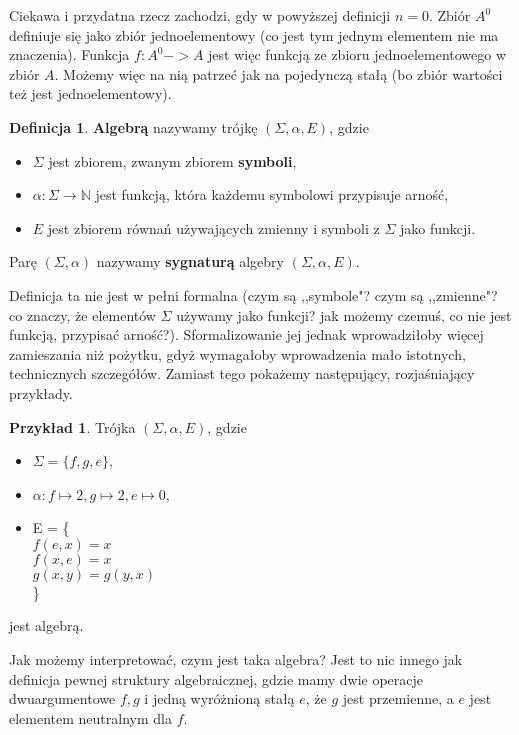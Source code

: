 \documentclass{article}
\theoremstyle{definition}
\newtheorem{definition}{Definicja}[section]
\newtheorem{example}{Przykład}[section]
\begin{document}
Ciekawa i przydatna rzecz zachodzi, gdy w powyższej definicji $n = 0$.
Zbiór $A^0$ definiuje się jako zbiór jednoelementowy (co jest tym jednym elementem nie ma znaczenia).
Funkcja $f:A^0 -> A$ jest więc funkcją ze zbioru jednoelementowego w zbiór $A$.
Możemy więc na nią patrzeć jak na pojedynczą stałą (bo zbiór wartości też jest jednoelementowy).

\begin{definition}
	\textbf{Algebrą} nazywamy trójkę $(\Sigma, \alpha, E)$,
	gdzie
	\begin{itemize}
		\item $\Sigma$ jest zbiorem, zwanym zbiorem \textbf{symboli},
		\item $\alpha: \Sigma \to \mathbb{N}$ jest funkcją, która każdemu symbolowi przypisuje arność,
		\item $E$ jest zbiorem równań używających zmienny i symboli z $\Sigma$ jako funkcji.
	\end{itemize}
	Parę $(\Sigma, \alpha)$ nazywamy \textbf{sygnaturą} algebry $(\Sigma, \alpha, E)$.
\end{definition}

Definicja ta nie jest w pełni formalna (czym są ,,symbole"? czym są ,,zmienne"? co znaczy, że elementów $\Sigma$ używamy jako funkcji? jak możemy czemuś, co nie jest funkcją, przypisać arność?).
Sformalizowanie jej jednak wprowadziłoby więcej zamieszania niż pożytku,
gdyż wymagałoby wprowadzenia mało istotnych, technicznych szczegółów.
Zamiast tego pokażemy następujący,
rozjaśniający przykłady.

\begin{example}
	Trójka $(\Sigma, \alpha, E)$, gdzie
	\begin{itemize}
		\item $\Sigma = \{f, g, e\}$,
		\item $\alpha: f \mapsto 2, g \mapsto 2, e \mapsto 0$,
		\item E = \{\\
		      $f(e, x) = x$ \\
		      $f(x, e) = x$ \\
		      $g(x, y) = g(y, x)$ \\
		      \}
	\end{itemize}
	jest algebrą.
\end{example}
Jak możemy interpretować, czym jest taka algebra?
Jest to nic innego jak definicja pewnej struktury algebraicznej,
gdzie mamy dwie operacje dwuargumentowe $f, g$ i jedną wyróżnioną stałą $e$,
że $g$ jest przemienne, a $e$ jest elementem neutralnym dla $f$.
\end{document}
